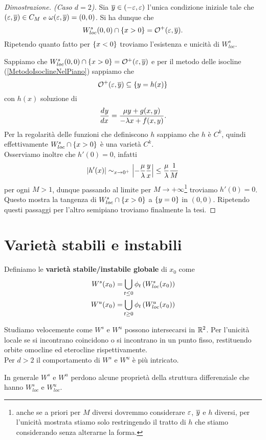 \begin{proof}[Dimostrazione. (Caso $d=2$)]
\noindent
Sia $\overline{y}\in(-\varepsilon,\varepsilon)$ l'unica condizione iniziale tale che $(\varepsilon,\overline{y})\in C_M$ e $\omega(\varepsilon,\overline{y})=(0,0)$. Si ha dunque che 
\[W^s_{loc}(0,0)\cap \left\{{x>0}\right\}=\mathcal{O}^+(\varepsilon,\overline{y}).\]
Ripetendo quanto fatto per $\left\{{x<0}\right\}$ troviamo l'esistenza e unicit\`a di $W^s_{loc}$.
\vspace{0.5cm}

\noindent Sappiamo che $W^s_{loc}(0,0)\cap \left\{{x>0}\right\}=\mathcal{O}^+(\varepsilon,\overline{y})$ e per il metodo delle isocline (\ref{MetodoIsoclineNelPiano}) sappiamo che
\[\mathcal{O}^+(\varepsilon,\overline{y})\subseteq \left\{{y=h(x)}\right\}\]
con $h(x)$ soluzione di
\[\dd xy=\frac{\mu y+g(x,y)}{-\la x+f(x,y)}.\]
Per la regolarit\`a delle funzioni che definiscono $h$ sappiamo che $h$ \`e $C^k$, quindi effettivamente $W^s_{loc}\cap \left\{{x>0}\right\}$ \`e una variet\`a $C^k$.\\
Osserviamo inoltre che $h'(0)=0$, infatti
\[\left|{h'(x)}\right|\sim_{x\to 0^+}\left|{-\frac \mu{\lambda}\frac yx}\right|\leq \frac\mu{\lambda}\frac1M\]
per ogni $M>1$, dunque passando al limite per $M\to+\infty$\footnote{anche se a priori per $M$ diversi dovremmo considerare $\varepsilon$, $\overline{y}$ e $h$ diversi, per l'unicit\`a mostrata stiamo solo restringendo il tratto di $h$ che stiamo considerando senza alterarne la forma.} troviamo $h'(0)=0$. Questo mostra la tangenza di $W^s_{loc}\cap \left\{{x>0}\right\}$ a $\left\{{y=0}\right\}$ in $(0,0)$. Ripetendo questi passaggi per l'altro semipiano troviamo finalmente la tesi. 
\end{proof}

\section{Variet\`a stabili e instabili}

\begin{definition}
Definiamo le \textbf{variet\`a stabile/instabile globale} di $x_0$ come
\begin{align*}
W^s(x_0)=&\bigcup_{t\leq0}\phi_t\left({W^s_{loc}(x_0)}\right)\\
W^u(x_0)=&\bigcup_{t\geq0}\phi_t\left({W^u_{loc}(x_0)}\right)
\end{align*}
\end{definition}
\begin{remark}
Studiamo velocemente come $W^s$ e $W^u$ possono intersecarsi in $\mathbb{R}^2$. Per l'unicit\`a locale se si incontrano coincidono o si incontrano in un punto fisso, restituendo orbite omocline ed eterocline rispettivamente.\\
Per $d>2$ il comportamento di $W^s$ e $W^u$ \`e pi\`u intricato.
\end{remark}
\begin{remark}
In generale $W^s$ e $W^u$ perdono alcune propriet\`a della struttura differenziale che hanno $W^s_{loc}$ e $W^u_{loc}$.
\end{remark}


